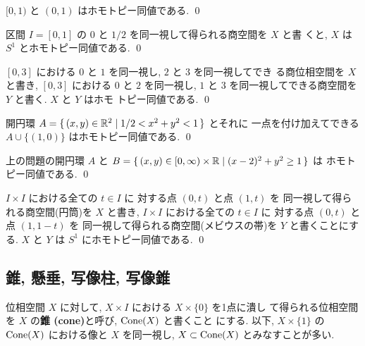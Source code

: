 \documentclass[12pt,twoside]{jarticle}
\begin{document}
\begin{question}
  $[0,1)$ と $(0,1)$ はホモトピー同値である. \qed
\end{question}

\begin{question}\qstar{*}
  \label{q:he-[0,1]}
  区間 $I=[0,1]$ の $0$ と $1/2$ を同一視して得られる商空間を $X$ と書
  くと, $X$ は $S^1$ とホモトピー同値である. \qed
\end{question}

\begin{question}\qstar{*}
  \label{q:he-[0,3]}
  $[0,3]$ における $0$ と $1$ を同一視し, $2$ と $3$ を同一視してでき
  る商位相空間を $X$ と書き, $[0,3]$ における $0$ と $2$ を同一視し,
  $1$ と $3$ を同一視してできる商空間を $Y$ と書く. $X$ と $Y$ はホモ
  トピー同値である. \qed
\end{question}

\begin{question}
  開円環 $A=\{\,(x,y)\in{\mathbb R}^2\mid 1/2<x^2+y^2<1\,\}$ とそれに
  一点を付け加えてできる $A\cup\{(1,0)\}$ はホモトピー同値である. \qed
\end{question}

\begin{question}
  上の問題の開円環 $A$ 
  と $B=\{\,(x,y)\in[0,\infty)\times{\mathbb R}\mid (x-2)^2+y^2\ge 1\,\}$ は
  ホモトピー同値である. 
  \qed
\end{question}

\begin{question}\qstar{*}
  $I\times I$ における全ての $t\in I$ に
  対する点 $(0,t)$ と点 $(1,t)$ を
  同一視して得られる商空間(円筒)を $X$ と書き, 
  $I\times I$ における全ての $t\in I$ に
  対する点 $(0,t)$ と点 $(1,1-t)$ を
  同一視して得られる商空間(メビウスの帯)を $Y$ と書くことにする. 
  $X$ と $Y$ は $S^1$ にホモトピー同値である. \qed
\end{question}


\subsection{錐, 懸垂, 写像柱, 写像錐}


位相空間 $X$ に対して, $X\times I$ における $X\times\{0\}$ を1点に潰し
て得られる位相空間を $X$ の{\bf 錐 (cone)}と呼び, $\mathop{\mathrm{Cone}}(X)$ と書くこと
にする. 以下, $X\times\{1\}$ の $\mathop{\mathrm{Cone}}(X)$ における像と $X$ を同一視し,
$X\subset \mathop{\mathrm{Cone}}(X)$ とみなすことが多い.
\end{document}

